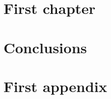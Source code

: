 \documentclass[a4paper,twoside,12pt]{book}
\begin{document}
\chapter{First chapter\label{chap:first-chapter}}

\cleardoublepage{}

\chapter*{Conclusions}

\cleardoublepage{}



\cleardoublepage{}

\appendix
\chapter{First appendix\label{app:first-appendix}}

\cleardoublepage{}

\end{document}
